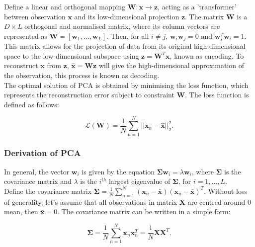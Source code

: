 \documentclass{article}\usepackage[]{graphicx}\usepackage[]{xcolor}
\numberwithin{equation}{section}
\begin{document}
{\noindent
Define a linear and orthogonal mapping $\mathbf{W}: \mathbf{x} \to \mathbf{z}$, acting as a 'transformer' between observation $\mathbf{x}$ and its low-dimensional projection $\mathbf{z}$. The matrix $\mathbf{W}$ is a $D \times L$ orthogonal and normalised matrix, where its column vectors are represented as $\mathbf{W} = [\mathbf{w}_1, \dots, \mathbf{w}_L]$. Then, for all $i \neq j$, $\mathbf{w}_i \mathbf{w}_j = 0$ and $\mathbf{w}_i^T \mathbf{w}_i = 1$. This matrix allows for the projection of data from its original high-dimensional space to the low-dimensional subspace using $\mathbf{z} = \mathbf{W}^T\mathbf{x}$, known as encoding. To reconstruct $\mathbf{x}$ from $\mathbf{z}$, $\hat{\mathbf{x}} = \mathbf{W}\mathbf{z}$ will give the high-dimensional approximation of the observation, this process is known as decoding.\\

\noindent
The optimal solution of PCA is obtained by minimising the loss function, which represents the reconstruction error subject to constraint $\mathbf{W}$. The loss function is defined as follows:

\begin{equation}
\mathcal{L}(\mathbf{W}) = \frac{1}{N}\sum_{n=1}^{N}||\mathbf{x}_n - \hat{\mathbf{x}}||^2_2.
\end{equation}

\subsubsection{Derivation of PCA}

In general, the vector $\mathbf{w}_i$ is given by the equation $\mathbf{\Sigma} \mathbf{w}_i = \lambda \mathbf{w}_i$, where $\mathbf{\Sigma}$ is the covariance matrix and $\lambda$ is the $i^{th}$ largest eigenvalue of $\mathbf{\Sigma}$, for $i = 1, \dots, L$.\\

\noindent
Define the covariance matrix $\mathbf{\Sigma} = \frac{1}{N} \sum_{n=1}^N(\mathbf{x}_n-\bar{\mathbf{x}})(\mathbf{x}_n-\bar{\mathbf{x}})^T$. Without loss of generality, let's assume that all observations in matrix $\mathbf{X}$ are centred around $0$ mean, then $\bar{\mathbf{x}} = 0$. The covariance matrix can be written in a simple form:

\begin{equation}
\mathbf{\Sigma} = \frac{1}{N} \sum_{n=1}^N\mathbf{x}_n\mathbf{x}_n^T = \frac{1}{N} \mathbf{X}\mathbf{X}^T. \label{eq:cov}
\end{equation}

}
\end{document}
